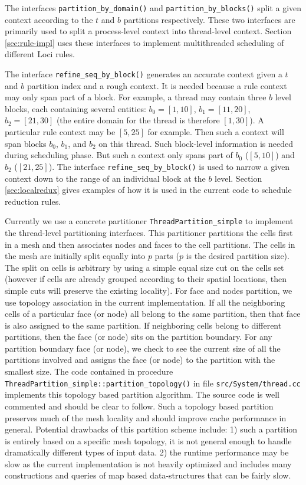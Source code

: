 \documentclass{article}
\begin{document}
The interfaces \lstinline{partition_by_domain()} and
\lstinline{partition_by_blocks()} split a given context according to the
$t$ and $b$ partitions respectively.  These two interfaces are primarily
used to split a process-level context into thread-level context.
Section \ref{sec:rule-impl} uses these interfaces to implement
multithreaded scheduling of different Loci rules.

The interface \lstinline{refine_seq_by_block()} generates an accurate
context given a $t$ and $b$ partition index and a rough context.  It is
needed because a rule context may only span part of a block.  For
example, a thread may contain three $b$ level blocks, each containing
several entities: $b_0 = [1,10]$, $b_1 = [11,20]$, $b_2 = [21,30]$ (the
entire domain for the thread is therefore $[1,30]$).  A particular rule
context may be $[5, 25]$ for example.  Then such a context will span
blocks $b_0$, $b_1$, and $b_2$ on this thread.  Such block-level
information is needed during scheduling phase.  But such a context only
spans part of $b_0$ ($[5,10]$) and $b_2$ ($[21,25]$).  The interface
\lstinline{refine_seq_by_block()} is used to narrow a given context down
to the range of an individual block at the $b$ level.  Section
\ref{sec:localredux} gives examples of how it is used in the current
code to schedule reduction rules.

Currently we use a concrete partitioner
\lstinline{ThreadPartition_simple} to implement the thread-level
partitioning interfaces.  This partitioner partitions the cells first in
a mesh and then associates nodes and faces to the cell partitions.  The
cells in the mesh are initially split equally into $p$ parts ($p$ is the
desired partition size).  The split on cells is arbitrary by using a
simple equal size cut on the cells set (however if cells are already
grouped according to their spatial locations, then simple cuts will
preserve the existing locality).  For face and nodes partition,
we use topology association in the current implementation.  If all the
neighboring cells of a particular face (or node) all belong to the same
partition, then that face is also assigned to the same partition.  If
neighboring cells belong to different partitions, then the face (or
node) sits on the partition boundary.  For any partition boundary face
(or node), we check to see the current size of all the partitions
involved and assigns the face (or node) to the partition with the
smallest size.  The code contained in procedure
\lstinline{ThreadPartition_simple::partition_topology()} in file
\texttt{src/System/thread.cc} implements this topology based partition
algorithm.  The source code is well commented and should be clear to
follow.  Such a topology based partition preserves much of the mesh
locality and should improve cache performance in general.  Potential
drawbacks of this partition scheme include: 1) such a partition is
entirely based on a specific mesh topology, it is not general enough to
handle dramatically different types of input data.  2) the runtime
performance may be slow as the current implementation is not heavily
optimized and includes many constructions and queries of map based
data-structures that can be fairly slow.
\end{document}

